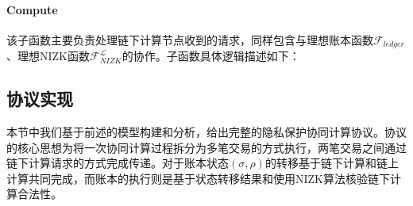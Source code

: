 \paragraph{Compute} 该子函数主要负责处理链下计算节点收到的请求，同样包含与理想账本函数$\mathcal{F}_{ledger}$、理想NIZK函数$\mathcal{F}_{NIZK}^\mathcal{L}$的协作。子函数具体逻辑描述如下：

\subsection{协议实现}
本节中我们基于前述的模型构建和分析，给出完整的隐私保护协同计算协议。协议的核心思想为将一次协同计算过程拆分为多笔交易的方式执行，两笔交易之间通过链下计算请求的方式完成传递。对于账本状态$(\sigma, \rho)$的转移基于链下计算和链上计算共同完成，而账本的执行则是基于状态转移结果和使用NIZK算法核验链下计算合法性。


